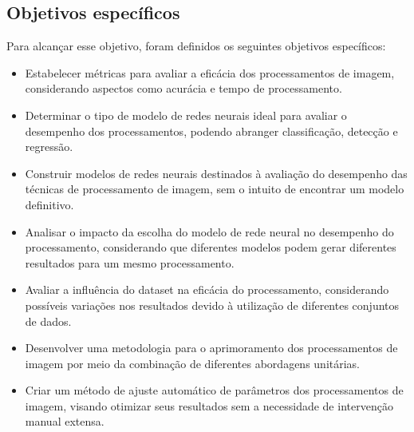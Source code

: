 \subsection{Objetivos específicos}

Para alcançar esse objetivo, foram definidos os seguintes objetivos específicos:

\begin{itemize}
    \item Estabelecer métricas para avaliar a eficácia dos processamentos de imagem, considerando aspectos como acurácia e tempo de processamento.
    \item Determinar o tipo de modelo de redes neurais ideal para avaliar o desempenho dos processamentos, podendo abranger classificação, detecção e regressão.
    \item Construir modelos de redes neurais destinados à avaliação do desempenho das técnicas de processamento de imagem, sem o intuito de encontrar um modelo definitivo.
    \item Analisar o impacto da escolha do modelo de rede neural no desempenho do processamento, considerando que diferentes modelos podem gerar diferentes resultados para um mesmo processamento.
    \item Avaliar a influência do dataset na eficácia do processamento, considerando possíveis variações nos resultados devido à utilização de diferentes conjuntos de dados.
    \item Desenvolver uma metodologia para o aprimoramento dos processamentos de imagem por meio da combinação de diferentes abordagens unitárias.
    \item Criar um método de ajuste automático de parâmetros dos processamentos de imagem, visando otimizar seus resultados sem a necessidade de intervenção manual extensa.
\end{itemize}